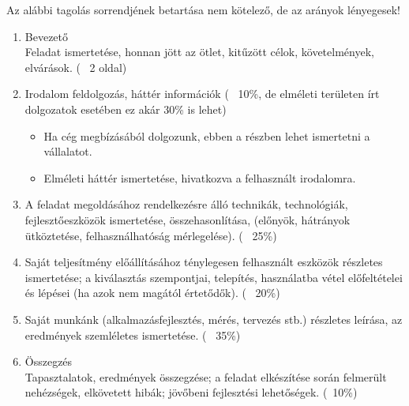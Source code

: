 Az alábbi tagolás sorrendjének betartása nem kötelező, de az arányok lényegesek!
\begin{enumerate}
	\item Bevezető\\
Feladat ismertetése, honnan jött az ötlet, kitűzött célok, követelmények, elvárások. (~ 2 oldal)
	\item Irodalom feldolgozás, háttér információk (~ 10\%, de elméleti területen írt dolgozatok esetében ez akár 30\% is lehet)
	\begin{itemize}
		\item Ha cég megbízásából dolgozunk, ebben a részben lehet ismertetni a vállalatot. 
		\item Elméleti háttér ismertetése, hivatkozva a felhasznált irodalomra. 
	\end{itemize}
	\item A feladat megoldásához rendelkezésre álló technikák, technológiák, fejlesztőeszközök ismertetése, összehasonlítása, (előnyök, hátrányok ütköztetése, felhasználhatóság mérlegelése). (~ 25\%)
	\item Saját teljesítmény előállításához ténylegesen felhasznált eszközök részletes ismertetése; a kiválasztás szempontjai, telepítés, használatba vétel előfeltételei és lépései (ha azok nem magától értetődők). (~ 20\%)
	\item Saját munkánk (alkalmazásfejlesztés, mérés, tervezés stb.) részletes leírása, az eredmények szemléletes ismertetése. (~ 35\%)
	\item Összegzés\\ Tapasztalatok, eredmények összegzése; a feladat elkészítése során felmerült nehézségek, elkövetett hibák; jövőbeni fejlesztési lehetőségek. (~10\%)
\end{enumerate}